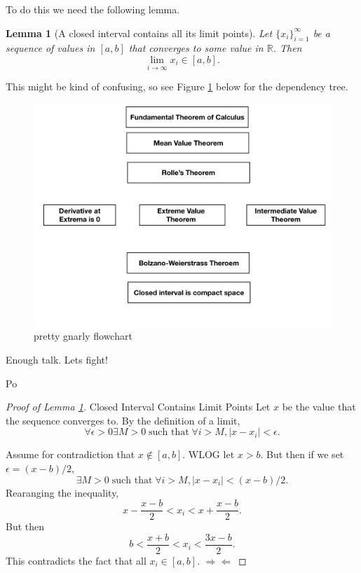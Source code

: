 \documentclass{article}[11pt]
\DeclareMathOperator{\st}{\text{ such that }}
\newcommand{\contr}[0]{ $\Rightarrow\!\Leftarrow$ }
\newtheorem{lemma}{Lemma}
\begin{document}
To do this we need the following lemma.
\begin{lemma}[A closed interval contains all its limit points]
	\label{lem:intervalContainsLimitPts}
	Let $\{x_i\}_{i=1}^\infty$ be a sequence of values in $[a,b]$ that converges to some value in $\mathbb{R}$. 
	Then $$\lim_{i\to \infty} x_i \in [a, b].$$
\end{lemma}

This might be kind of confusing, so see Figure \ref{fig:flowchart} below for the dependency tree.
\begin{center}
	\begin{figure}[h]
		\label{fig:flowchart}
	\centering
	\includegraphics[width=\linewidth]{FtcFlowChart/FtcFlowChart.png}
	\caption{pretty gnarly flowchart}
\end{figure}
\end{center}

\epigraph{Enough talk. Lets fight!}{Po}

\begin{proof}[Proof of Lemma \ref{lem:intervalContainsLimitPts}]{Closed Interval Contains Limit Points}
	Let $x$ be the value that the sequence converges to. 
	By the definition of a limit, 
	$$\forall \epsilon > 0 \exists M>0 \st \forall i>M, |x-x_i|< \epsilon.$$

	Assume for contradiction that $x\not\in [a,b]$. 
	WLOG let $x>b$. But then if we set $\epsilon = (x-b)/2$,
	$$\exists M>0 \st \forall i>M, |x-x_i| < (x-b)/2.$$
	Rearanging the inequality, 
	$$ x-\frac{x-b}{2}< x_i < x+\frac{x-b}{2}.$$
	But then
	$$ b < \frac{x+b}{2}< x_i < \frac{3x-b}{2}.$$
	This contradicts the fact that all $x_i \in [a, b].$\contr
\end{proof}
\end{document}
